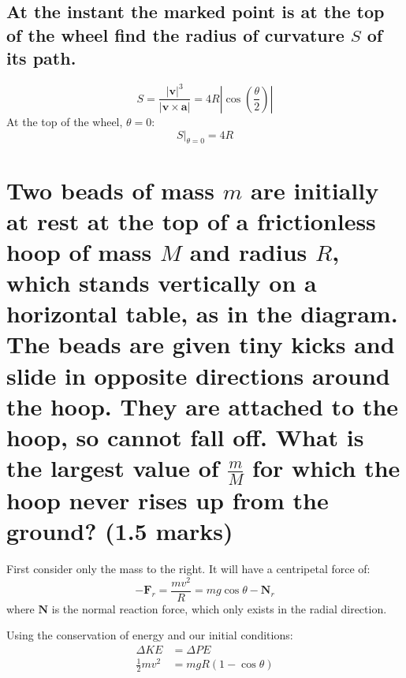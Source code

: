 \documentclass[a4paper]{scrartcl}
\begin{document}
\subsection{At the instant the marked point is at the top of the wheel find the radius of curvature \(S\) of its path.}
\[S = \frac{|\mathbf{v}|^3}{|\mathbf{v} \times \mathbf{a}|} = 4 R \left|\cos\left(\frac{\theta}{2}\right)\right|\]
At the top of the wheel, \(\theta = 0\):
\[S\big|_{\theta = 0} = 4 R\]

\section{Two beads of mass \(m\) are initially at rest at the top of a frictionless hoop of mass \(M\) and radius \(R\), which stands vertically on a horizontal table, as in the diagram. The beads are given tiny kicks and slide in opposite directions around the hoop. They are attached to the hoop, so cannot fall off. What is the largest value of \(\frac{m}{M}\) for which the hoop never rises up from the ground? (1.5 marks)}
\begin{center}
\end{center}

First consider only the mass to the right. It will have a centripetal force of:
\[-\mathbf{F}_r = \frac{m v^2}{R} = m g \cos \theta - \mathbf{N}_r\]
where \(\mathbf{N}\) is the normal reaction force, which only exists in the radial direction.

Using the conservation of energy and our initial conditions:
\begin{align*}
    \Delta KE &= \Delta PE \\
    \frac{1}{2} m v^2 &= m g R (1 - \cos \theta)
\end{align*}
\end{document}
